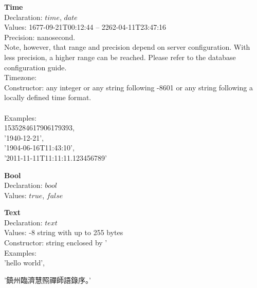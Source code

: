 \begin{minipage}{\textwidth}
\textbf{Time} \\
Declaration: $time$, $date$ \\
Values:   1677-09-21T00:12:44 --
          2262-04-11T23:47:16 \\
Precision: nanosecond. \\
Note, however, that range and precision depend on server configuration.
With less precision, a higher range can be reached.
Please refer to the database configuration guide. \\
Timezone:  \\
Constructor: any integer or any string following -8601 
or any string following a locally defined time format. \\
 \\
Examples:\\
1535284617906179393, \\
'1940-12-21', \\
'1904-06-16T11:43:10', \\
'2011-11-11T11:11:11.123456789'
\end{minipage}

\begin{minipage}{\textwidth}
\textbf{Bool} \\
Declaration: $bool$ \\
Values: $true$, $false$ \\
\end{minipage}

\begin{minipage}{\textwidth}
\textbf{Text} \\
Declaration: $text$ \\
Values: -8 string with up to 255 bytes\\
Constructor: string enclosed by ' \\
Examples:\\
'hello world',\\
\begin{CJK}{UTF8}{gbsn}
'鎮州臨濟慧照禪師語錄序。' 
\end{CJK} \\
\end{minipage}

